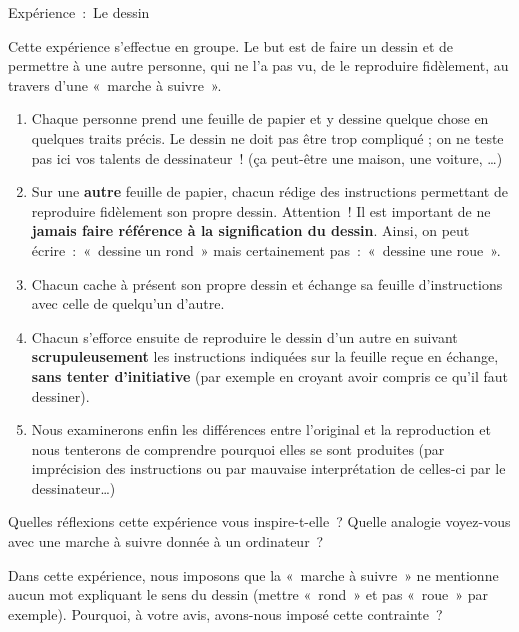 \clearpage
		\begin{Emphase}[exercice]{Expérience~:~Le dessin}

			Cette expérience s’effectue en groupe.
			Le but est de faire un dessin et de permettre à une autre personne, qui
			ne l’a pas vu, de le reproduire fidèlement, au travers
			d’une «~marche à suivre~».

			\begin{enumerate}
			\item
				Chaque personne prend une feuille de papier et 
				y dessine quelque chose en quelques traits précis. 
				Le dessin ne doit pas être trop compliqué ; 
				on ne teste pas ici vos talents de dessinateur~! 
				(ça peut-être une maison, une voiture, \dots)
			\item
				Sur une \textbf{autre} feuille de papier, 
				chacun rédige des instructions permettant de 
				reproduire fidèlement son propre dessin. 
				Attention~! Il est important de ne
				\textbf{jamais faire référence à la signification du dessin}. 
				Ainsi, on peut écrire~:~«~dessine un rond~» 
				mais certainement pas~:~«~dessine une roue~».
			\item
				Chacun cache à présent son propre dessin et échange 
				sa feuille d’instructions avec celle de quelqu’un d’autre.
			\item
				Chacun s’efforce ensuite de reproduire le dessin d’un autre 
				en suivant \textbf{scrupuleusement} les instructions indiquées 
				sur la feuille reçue en échange, \textbf{sans tenter
				d’initiative} (par exemple en croyant avoir compris ce
				qu’il faut dessiner).
			\item
				Nous examinerons enfin les différences entre l’original et 
				la reproduction et nous tenterons de comprendre pourquoi 
				elles se sont produites (par imprécision des instructions ou
				par mauvaise interprétation de celles-ci par le dessinateur\dots)
			\end{enumerate}

		\end{Emphase}

\bigskip
		Quelles réflexions cette expérience vous inspire-t-elle~?
		Quelle analogie voyez-vous avec une marche à suivre donnée à un
		ordinateur~?

		Dans cette expérience, nous imposons que la «~marche à suivre~» ne mentionne
		aucun mot expliquant le sens du dessin (mettre «~rond~» et pas «~roue~»
		par exemple). Pourquoi, à votre avis, avons-nous imposé cette
		contrainte~?

